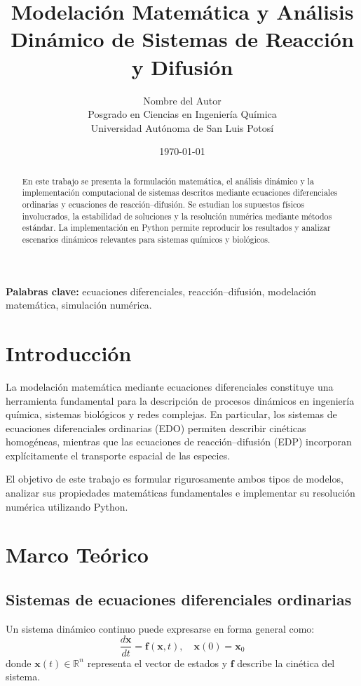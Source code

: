 \documentclass[12pt,letterpaper]{article}
\title{\textbf{Modelación Matemática y Análisis Dinámico de Sistemas de Reacción y Difusión}}
\author{
	Nombre del Autor \\
	\small Posgrado en Ciencias en Ingeniería Química \\
	\small Universidad Autónoma de San Luis Potosí
}
\date{\small \today}
\begin{document}
	\maketitle
	
	\begin{abstract}
		En este trabajo se presenta la formulación matemática, el análisis dinámico y la implementación computacional de sistemas descritos mediante ecuaciones diferenciales ordinarias y ecuaciones de reacción--difusión. Se estudian los supuestos físicos involucrados, la estabilidad de soluciones y la resolución numérica mediante métodos estándar. La implementación en Python permite reproducir los resultados y analizar escenarios dinámicos relevantes para sistemas químicos y biológicos.
	\end{abstract}
	
	\noindent \textbf{Palabras clave:} ecuaciones diferenciales, reacción--difusión, modelación matemática, simulación numérica.
	
	\section{Introducción}
	La modelación matemática mediante ecuaciones diferenciales constituye una herramienta fundamental para la descripción de procesos dinámicos en ingeniería química, sistemas biológicos y redes complejas. En particular, los sistemas de ecuaciones diferenciales ordinarias (EDO) permiten describir cinéticas homogéneas, mientras que las ecuaciones de reacción--difusión (EDP) incorporan explícitamente el transporte espacial de las especies.
	
	El objetivo de este trabajo es formular rigurosamente ambos tipos de modelos, analizar sus propiedades matemáticas fundamentales e implementar su resolución numérica utilizando Python.
	
	\section{Marco Teórico}
	
	\subsection{Sistemas de ecuaciones diferenciales ordinarias}
	Un sistema dinámico continuo puede expresarse en forma general como:
	\begin{equation}
		\frac{d\bm{x}}{dt} = \bm{f}(\bm{x},t), \quad \bm{x}(0)=\bm{x}_0
	\end{equation}
	donde $\bm{x}(t)\in\mathbb{R}^n$ representa el vector de estados y $\bm{f}$ describe la cinética del sistema.
	
\end{document}
